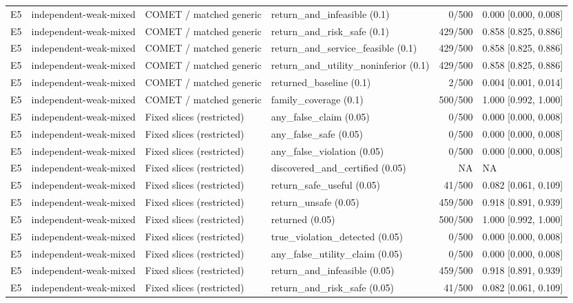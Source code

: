 \begin{longtable}{p{.04\linewidth}p{.18\linewidth}p{.19\linewidth}p{.16\linewidth}r p{.21\linewidth}}
E5 & independent-weak-mixed & COMET / matched generic & return\_and\_infeasible (0.1) & 0/500 & 0.000 [0.000, 0.008]\\
E5 & independent-weak-mixed & COMET / matched generic & return\_and\_risk\_safe (0.1) & 429/500 & 0.858 [0.825, 0.886]\\
E5 & independent-weak-mixed & COMET / matched generic & return\_and\_service\_feasible (0.1) & 429/500 & 0.858 [0.825, 0.886]\\
E5 & independent-weak-mixed & COMET / matched generic & return\_and\_utility\_noninferior (0.1) & 429/500 & 0.858 [0.825, 0.886]\\
E5 & independent-weak-mixed & COMET / matched generic & returned\_baseline (0.1) & 2/500 & 0.004 [0.001, 0.014]\\
E5 & independent-weak-mixed & COMET / matched generic & family\_coverage (0.1) & 500/500 & 1.000 [0.992, 1.000]\\
E5 & independent-weak-mixed & Fixed slices (restricted) & any\_false\_claim (0.05) & 0/500 & 0.000 [0.000, 0.008]\\
E5 & independent-weak-mixed & Fixed slices (restricted) & any\_false\_safe (0.05) & 0/500 & 0.000 [0.000, 0.008]\\
E5 & independent-weak-mixed & Fixed slices (restricted) & any\_false\_violation (0.05) & 0/500 & 0.000 [0.000, 0.008]\\
E5 & independent-weak-mixed & Fixed slices (restricted) & discovered\_and\_certified (0.05) & NA & NA\\
E5 & independent-weak-mixed & Fixed slices (restricted) & return\_safe\_useful (0.05) & 41/500 & 0.082 [0.061, 0.109]\\
E5 & independent-weak-mixed & Fixed slices (restricted) & return\_unsafe (0.05) & 459/500 & 0.918 [0.891, 0.939]\\
E5 & independent-weak-mixed & Fixed slices (restricted) & returned (0.05) & 500/500 & 1.000 [0.992, 1.000]\\
E5 & independent-weak-mixed & Fixed slices (restricted) & true\_violation\_detected (0.05) & 0/500 & 0.000 [0.000, 0.008]\\
E5 & independent-weak-mixed & Fixed slices (restricted) & any\_false\_utility\_claim (0.05) & 0/500 & 0.000 [0.000, 0.008]\\
E5 & independent-weak-mixed & Fixed slices (restricted) & return\_and\_infeasible (0.05) & 459/500 & 0.918 [0.891, 0.939]\\
E5 & independent-weak-mixed & Fixed slices (restricted) & return\_and\_risk\_safe (0.05) & 41/500 & 0.082 [0.061, 0.109]\\

\end{longtable}
